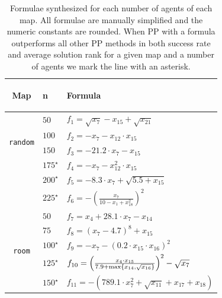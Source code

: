 \documentclass[letterpaper]{article}
\renewcommand{\max}{\operatornamewithlimits{max}\limits}
\begin{document}
\begin{table}[t!]
        \caption{Formulae synthesized for each number of agents of each map. All formulae are manually simplified and the numeric constants are rounded. When PP with a formula outperforms all other PP methods in both success rate and average solution rank for a given map and a number of agents we mark the line with an asterisk.}
        \label{tab:all_maps_synth_results}
        \centering
        {\small
        \begin{adjustbox}{width=0.1\columnwidth}
\begin{tabular}{c|l|l}
            \toprule
            \begin{turn}{90} \textbf{Map} \end{turn} & \textbf{n} & \textbf{Formula} \\
            \midrule
            \multirow{4}{*}{\begin{turn}{90} {\tt random} \end{turn}}
            & $ 50 $ & $ f_{1} = \sqrt{x_{7}} - x_{15} + \sqrt{x_{21}} $ \\
            & $ 100 $ & $ f_{2} = - x_{7} - x_{12} \cdot x_{15} $ \\
            & $ 150 $ & $ f_{3} = - 21.2 \cdot x_{7} - x_{15} $ \\
            & $ 175^\star $ & $ f_{4} = -x_{7} - x_{12}^2 \cdot x_{15} $ \\
            & $ 200^\star $ & $ f_{5} = - 8.3 \cdot x_{7} + \sqrt{5.5 + x_{15}} $ \\
            & $ 225^\star $ & $ f_{6} = -\left(\frac{x_{7}}{10 - x_{1} + x_{18}^2}\right)^2 $ \\
            \hline
            \multirow{5}{*}{\begin{turn}{90} {\tt room} \end{turn}}
            & $ 50 $ & $ f_{7} = x_{4} + 28.1 \cdot x_{7} - x_{14} $ \\
            & $ 75 $ & $ f_{8} = \left(x_{7} - 4.7\right)^8 + x_{15} $ \\
            & $ 100^\star $ & $ f_{9} = - x_{7} - \left(0.2 \cdot x_{15} \cdot x_{16}\right)^2 $ \\
            & $ 125^\star $ & $ f_{10} = \left(\frac{x_{4} \cdot x_{15}}{7.9 + \max\left\{x_{14}, \sqrt{x_{16}}\right\}}\right)^2 -\sqrt{x_{7}} $ \\
            & $ 150^\star $ & $ f_{11} = -(789.1 \cdot x_{7}^2 + \sqrt{x_{11}} + x_{17} + x_{18}) $ \\
            \hline

\end{tabular}
\end{adjustbox}}
\end{table}
\end{document}
